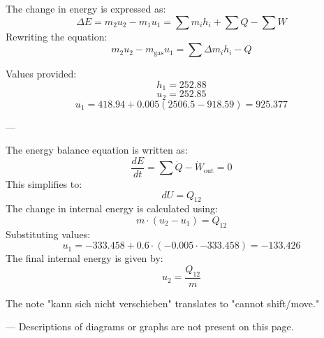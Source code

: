 The change in energy is expressed as:  
\[
\Delta E = m_2 u_2 - m_1 u_1 = \sum m_i h_i + \sum Q - \sum W
\]  
Rewriting the equation:  
\[
m_2 u_2 - m_{\text{gas}} u_1 = \sum \Delta m_i h_i - Q
\]  

Values provided:  
\[
h_1 = 252.88
\]  
\[
u_2 = 252.85
\]  
\[
u_1 = 418.94 + 0.005 \left( 2506.5 - 918.59 \right) = 925.377
\]  

---

The energy balance equation is written as:  
\[
\frac{dE}{dt} = \sum \dot{Q} - \dot{W}_{\text{out}} = 0
\]  
This simplifies to:  
\[
dU = Q_{12}
\]  
The change in internal energy is calculated using:  
\[
m \cdot (u_2 - u_1) = Q_{12}
\]  
Substituting values:  
\[
u_1 = -333.458 + 0.6 \cdot (-0.005 \cdot -333.458) = -133.426
\]  
The final internal energy is given by:  
\[
u_2 = \frac{Q_{12}}{m}
\]  

The note "kann sich nicht verschieben" translates to "cannot shift/move."  

---  
Descriptions of diagrams or graphs are not present on this page.